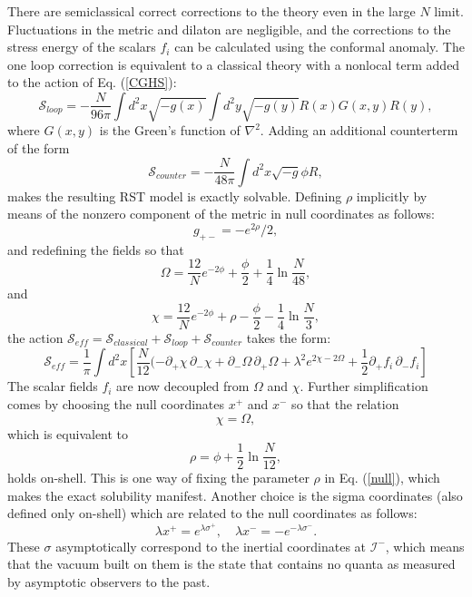 \documentclass[12pt]{article}
\begin{document}
There are semiclassical correct corrections to the theory even in the large $N$ limit.  Fluctuations in the metric and dilaton are negligible, and the corrections to the stress energy of the scalars $f_i$ can be calculated using the conformal anomaly.  The one loop correction is equivalent to a classical theory with a nonlocal term added to the action of Eq. (\ref{CGHS}):
\begin{equation}
\mathcal{S}_{loop} = -\frac{N}{96\pi}\int d^2x \sqrt{-g(x)} \int d^2y \sqrt{-g(y)}R(x)G(x,y)R(y),
\end{equation}
where $G(x,y)$ is the Green's function of $\nabla^2$.  Adding an additional counterterm of the form
\begin{equation}
\mathcal{S}_{counter} = -\frac{N}{48\pi} \int d^2x \sqrt{-g} \phi R,
\end{equation}
makes the resulting RST model is exactly solvable.  Defining $\rho$ implicitly by means of the nonzero component of the metric in null coordinates as follows:
\begin{equation}\label{null}
g_{+-} = -e^{2\rho}/2,
\end{equation}
and redefining the fields so that
\begin{equation}\label{Omega}
\Omega = \frac{12}{N}e^{-2\phi} + \frac{\phi}{2} + \frac{1}{4}\ln \frac{N}{48},
\end{equation}
and
\begin{equation}
\chi = \frac{12}{N}e^{-2\phi} + \rho - \frac{\phi}{2} - \frac{1}{4}\ln \frac{N}{3},
\end{equation}
the action 
$\mathcal{S}_{eff} = \mathcal{S}_{classical} + \mathcal{S}_{loop} + \mathcal{S}_{counter}$
takes the form:
\begin{equation}
\mathcal{S}_{eff} = \frac{1}{\pi} \int d^2x \left[
\frac{N}{12}(-\partial_{+}\chi\, \partial_{-}\chi + \partial_{-}\Omega\, \partial_{+}\Omega
+ \lambda^2 e^{2\chi - 2\Omega} + \frac{1}{2} \partial_{+}f_i\, \partial_{-}f_i \right]
\end{equation}
The scalar fields $f_i$ are now decoupled from $\Omega$ and $\chi$.  Further simplification comes by choosing the null coordinates $x^{+}$ and $x^{-}$ so that the relation
\begin{equation}\label{Kruskal}
\chi = \Omega,  
\end{equation}
which is equivalent to
\begin{equation}
\rho = \phi + \frac{1}{2}\ln\frac{N}{12},\end{equation}
holds on-shell.  This is one way of fixing the parameter $\rho$ in Eq. (\ref{null}), which makes the exact solubility manifest.  Another choice is the sigma coordinates (also defined only on-shell) which are related to the null coordinates as follows:
\begin{equation}
\lambda x^{+} = e^{\lambda \sigma^{+}},\quad \lambda x^{-} = -e^{-\lambda \sigma^{-}}.
\end{equation}
These $\sigma$ asymptotically correspond to the inertial coordinates at $\mathcal{I}^{-}$, which means that the vacuum built on them is the state that contains no quanta as measured by asymptotic observers to the past.
\end{document}
